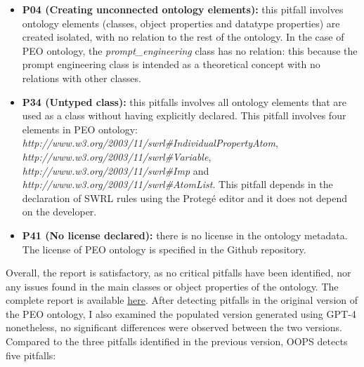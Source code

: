 \begin{itemize}
    \item \textbf{P04 (Creating unconnected ontology elements):} this pitfall involves ontology elements (classes, object properties and datatype properties) are created isolated, with no relation to the rest of the ontology. In the case of PEO ontology, the \textit{prompt\_engineering} class has no relation: this because the prompt engineering class is intended as a theoretical concept with no relations with other classes.

    \item \textbf{P34 (Untyped class):} this pitfalls involves all ontology elements that are used as a class without having explicitly declared. This pitfall involves four elements in PEO ontology: \\ \textit{http://www.w3.org/2003/11/swrl\#IndividualPropertyAtom},\\ \textit{http://www.w3.org/2003/11/swrl\#Variable},\\ \textit{http://www.w3.org/2003/11/swrl\#Imp} and \\\textit{http://www.w3.org/2003/11/swrl\#AtomList}.
    This pitfall depends in the declaration of SWRL rules using the Protegé editor and it does not depend on the developer.

    \item \textbf{P41 (No license declared):} there is no license in the ontology metadata. The license of PEO ontology is specified in the Github repository.
    
\end{itemize}
Overall, the report is satisfactory, as no critical pitfalls have been identified, nor any issues found in the main classes or object properties of the ontology. The complete report is available \href{https://github.com/simonegramegna/peo/blob/main/evaluation/oops_report_peo.xml}{here}. After detecting pitfalls in the original version of the PEO ontology, I also examined the populated version generated using GPT-4 nonetheless, no significant differences were observed between the two versions. Compared to the three pitfalls identified in the previous version, OOPS detects five pitfalls:
